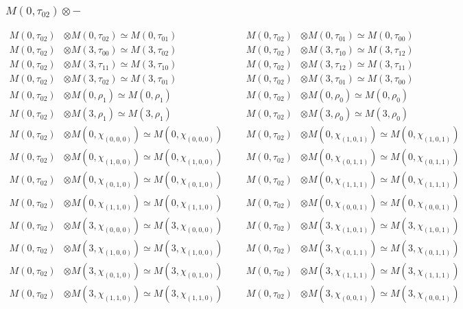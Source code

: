 \subsubsection{$ M(0,\tau_{02})\otimes -$}
\begin{align*}
M(0,\tau_{02}) &\otimes M(0,\tau_{02}) \simeq M(0,\tau_{01}) &&& M(0,\tau_{02}) &\otimes M(0,\tau_{01}) \simeq M(0,\tau_{00})\\
M(0,\tau_{02}) &\otimes M(3,\tau_{00}) \simeq M(3,\tau_{02}) &&& M(0,\tau_{02}) &\otimes M(3,\tau_{10}) \simeq M(3,\tau_{12})\\
M(0,\tau_{02}) &\otimes M(3,\tau_{11}) \simeq M(3,\tau_{10}) &&& M(0,\tau_{02}) &\otimes M(3,\tau_{12}) \simeq M(3,\tau_{11})\\
M(0,\tau_{02}) &\otimes M(3,\tau_{02}) \simeq M(3,\tau_{01}) &&& M(0,\tau_{02}) &\otimes M(3,\tau_{01}) \simeq M(3,\tau_{00})\\
M(0,\tau_{02}) &\otimes M(0,\rho_{1}) \simeq M(0,\rho_{1}) &&& M(0,\tau_{02}) &\otimes M(0,\rho_{0}) \simeq M(0,\rho_{0})\\
M(0,\tau_{02}) &\otimes M(3,\rho_{1}) \simeq M(3,\rho_{1}) &&& M(0,\tau_{02}) &\otimes M(3,\rho_{0}) \simeq M(3,\rho_{0})\\
M(0,\tau_{02}) &\otimes M(0,\chi_{(0,0,0)}) \simeq M(0,\chi_{(0,0,0)}) &&& M(0,\tau_{02}) &\otimes M(0,\chi_{(1,0,1)}) \simeq M(0,\chi_{(1,0,1)})\\
M(0,\tau_{02}) &\otimes M(0,\chi_{(1,0,0)}) \simeq M(0,\chi_{(1,0,0)}) &&& M(0,\tau_{02}) &\otimes M(0,\chi_{(0,1,1)}) \simeq M(0,\chi_{(0,1,1)})\\
M(0,\tau_{02}) &\otimes M(0,\chi_{(0,1,0)}) \simeq M(0,\chi_{(0,1,0)}) &&& M(0,\tau_{02}) &\otimes M(0,\chi_{(1,1,1)}) \simeq M(0,\chi_{(1,1,1)})\\
M(0,\tau_{02}) &\otimes M(0,\chi_{(1,1,0)}) \simeq M(0,\chi_{(1,1,0)}) &&& M(0,\tau_{02}) &\otimes M(0,\chi_{(0,0,1)}) \simeq M(0,\chi_{(0,0,1)})\\
M(0,\tau_{02}) &\otimes M(3,\chi_{(0,0,0)}) \simeq M(3,\chi_{(0,0,0)}) &&& M(0,\tau_{02}) &\otimes M(3,\chi_{(1,0,1)}) \simeq M(3,\chi_{(1,0,1)})\\
M(0,\tau_{02}) &\otimes M(3,\chi_{(1,0,0)}) \simeq M(3,\chi_{(1,0,0)}) &&& M(0,\tau_{02}) &\otimes M(3,\chi_{(0,1,1)}) \simeq M(3,\chi_{(0,1,1)})\\
M(0,\tau_{02}) &\otimes M(3,\chi_{(0,1,0)}) \simeq M(3,\chi_{(0,1,0)}) &&& M(0,\tau_{02}) &\otimes M(3,\chi_{(1,1,1)}) \simeq M(3,\chi_{(1,1,1)})\\
M(0,\tau_{02}) &\otimes M(3,\chi_{(1,1,0)}) \simeq M(3,\chi_{(1,1,0)}) &&& M(0,\tau_{02}) &\otimes M(3,\chi_{(0,0,1)}) \simeq M(3,\chi_{(0,0,1)})\\

\end{align*}
